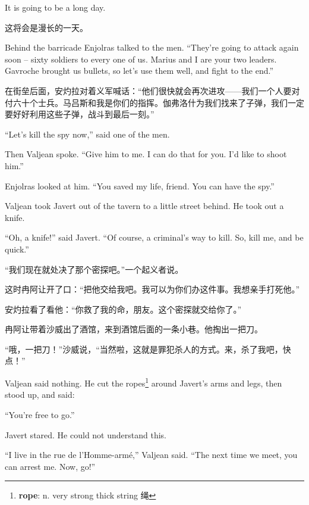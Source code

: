 \documentclass[fontset=ubuntu, zihao=5]{ctexart}
\begin{document}
\begin{paracol}{2}
\switchcolumn*

It is going to be a long day.

\switchcolumn

这将会是漫长的一天。

\switchcolumn*

\sectionbreak

Behind the barricade Enjolras talked to the men. ``They're going to attack again soon – sixty soldiers to every one of us. Marius and I are your two leaders. Gavroche brought us bullets, so let's use them well, and fight to the end.''

\switchcolumn

\sectionbreak

在街垒后面，安灼拉对着义军喊话：“他们很快就会再次进攻——我们一个人要对付六十个士兵。马吕斯和我是你们的指挥。伽弗洛什为我们找来了子弹，我们一定要好好利用这些子弹，战斗到最后一刻。”

\switchcolumn*

``Let's kill the spy now,'' said one of the men.


Then Valjean spoke. ``Give him to me. I can do that for you. I'd like to shoot him.''


Enjolras looked at him. ``You saved my life, friend. You can have the spy.''


Valjean took Javert out of the tavern to a little street behind. He took out a knife.

``Oh, a knife!'' said Javert. ``Of course, a criminal's way to kill. So, kill me, and be quick.''

\switchcolumn

“我们现在就处决了那个密探吧。”一个起义者说。

这时冉阿让开了口：“把他交给我吧。我可以为你们办这件事。我想亲手打死他。”

安灼拉看了看他：“你救了我的命，朋友。这个密探就交给你了。”

冉阿让带着沙威出了酒馆，来到酒馆后面的一条小巷。他掏出一把刀。

“哦，一把刀！”沙威说，“当然啦，这就是罪犯杀人的方式。来，杀了我吧，快点！”

\switchcolumn*

Valjean said nothing. He cut the ropes\footnote{\textbf{rope}: n. very
  strong thick string 绳} around Javert's arms and legs, then stood up, and
said:

``You're free to go.''

Javert stared. He could not understand this.


``I live in the rue de l'Homme-armé,'' Valjean said. ``The next time we meet, you can arrest me. Now, go!''


\end{paracol}
\end{document}
